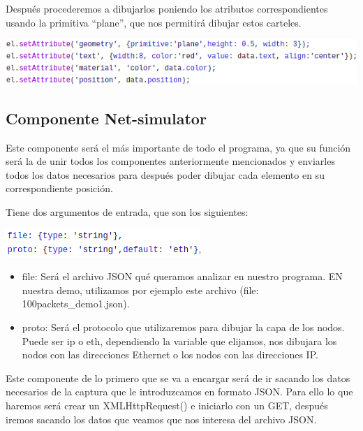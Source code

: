 \documentclass[a4paper, 12pt]{book}
\begin{document}
Después procederemos a dibujarlos poniendo los atributos correspondientes usando la primitiva “plane”, que nos permitirá dibujar estos carteles.

\begin{center}
    \includegraphics[scale=0.7]{img/atrib_comp_poster.png}
\end{center}

\newpage
\subsection{Componente Net-simulator}


Este componente será el más importante de todo el programa, ya que su función será la de unir todos los componentes anteriormente mencionados y enviarles todos los datos necesarios para después poder dibujar cada elemento en su correspondiente posición.

Tiene dos argumentos de entrada, que son los siguientes:

\begin{center}
    \includegraphics[scale=0.7]{img/arg_comp_netsim.png}
\end{center}

\begin{itemize}
    \item file: Será el archivo JSON qué queramos analizar en nuestro programa. EN nuestra demo, utilizamos por ejemplo este archivo (file: 100packets\_demo1.json).

    \item proto: Será el protocolo que utilizaremos para dibujar la capa de los nodos. Puede ser ip o eth, dependiendo la variable que elijamos, nos dibujara los nodos con las direcciones Ethernet o los nodos con las direcciones IP.

\end{itemize}


Este componente de lo primero que se va a encargar será de ir sacando los datos necesarios de la captura que le introduzcamos en formato JSON. Para ello lo que haremos será crear un XMLHttpRequest() e iniciarlo con un GET, después iremos sacando los datos que veamos que nos interesa del archivo JSON.
\end{document}
